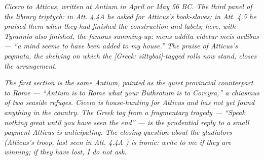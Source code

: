 
\textit{Cicero to Atticus, written at Antium in April or May
56 BC. The third panel of the library triptych: in
\textit{Att.} 4.4A he asked for Atticus's book-slaves; in
\textit{Att.} 4.5 he praised them when they had finished the
construction and labels; here, with Tyrannio also finished,
the famous summing-up: \textit{mens addita videtur meis
aedibus} --- ``a mind seems to have been added to my house.''
The praise of Atticus's pegmata, the shelving on which the
\textit{[Greek: sittybai]}-tagged rolls now stand, closes the
arrangement.}

\textit{The first section is the same Antium, painted as the
quiet provincial counterpart to Rome --- ``Antium is to Rome
what your Buthrotum is to Corcyra,'' a chiasmus of two
seaside refuges. Cicero is house-hunting for Atticus and has
not yet found anything in the country. The Greek tag from a
fragmentary tragedy --- ``Speak nothing great until you have
seen the end'' --- is the prudential reply to a small payment
Atticus is anticipating. The closing question about the
gladiators (Atticus's troop, last seen in \textit{Att.}
4.4A ) is ironic: write to me if they are
winning; if they have lost, I do not ask.}
